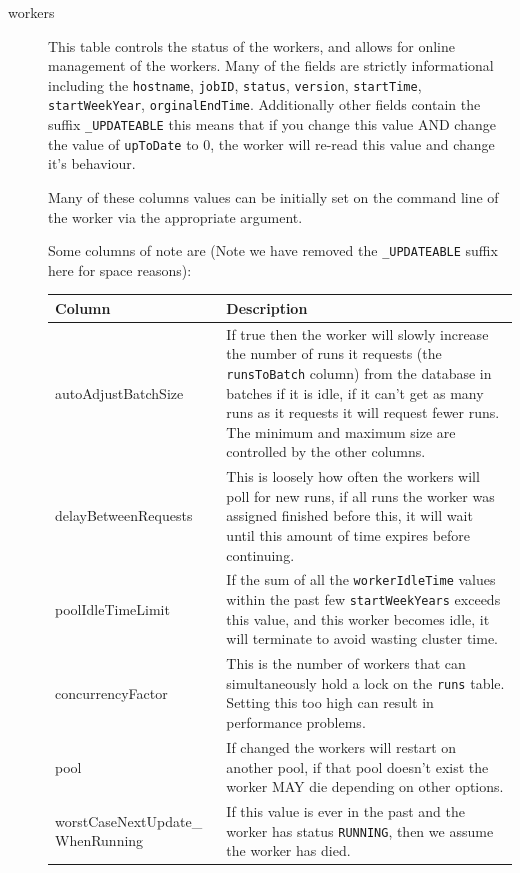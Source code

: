 \documentclass[11pt,letterpaper,oneside]{article}
\begin{document}
\begin{description}
\item[workers]

This table controls the status of the workers, and allows for online management of the workers. Many of the fields are  strictly informational including the \texttt{hostname}, \texttt{jobID}, \texttt{status}, \texttt{version}, \texttt{startTime}, \texttt{startWeekYear}, \texttt{orginalEndTime}. Additionally other fields contain the suffix \texttt{\_UPDATEABLE} this means that if you change this value \textsc{AND} change the value of \texttt{upToDate} to 0, the worker will re-read this value and change it's behaviour.


Many of these columns values can be initially set on the command line of the worker via the appropriate argument.

Some columns of note are (Note we have removed the \texttt{\_UPDATEABLE} suffix here for space reasons):

\begin{center}
\begin{tabular}{p{3.5cm} | p{11.5cm} }
Column & Description \\
\hline
\hline
autoAdjustBatchSize & If true then the worker will slowly increase the number of runs it requests (the \texttt{runsToBatch} column) from the database in batches if it is idle, if it can't get as many runs as it requests it will request fewer runs.  The minimum and maximum size are controlled by the other columns.  \\
\hline 
delayBetweenRequests & This is loosely how often the workers will poll for new runs, if all runs the worker was assigned finished before this, it will wait until this amount of time expires before continuing. \\
\hline
poolIdleTimeLimit & If the sum of all the \texttt{workerIdleTime} values within the past few \texttt{startWeekYears} exceeds this value, and this worker becomes idle, it will terminate to avoid wasting cluster time.\\
\hline
concurrencyFactor & This is the number of workers that can simultaneously hold a lock on the \texttt{runs} table. Setting this too high can result in performance problems.\\
\hline
pool & If changed the workers will restart on another pool, if that pool doesn't exist the worker MAY die depending on other options. \\
\hline
worstCaseNextUpdate\_ WhenRunning & If this value is ever in the past and the worker has status \texttt{RUNNING}, then we assume the worker has died. \\
\hline 

\end{tabular}
\end{center}

\end{description}
\end{document}
